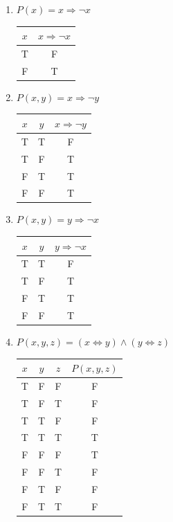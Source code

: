 \documentclass[12pt]{article}
\begin{document}
\begin{enumerate}
\begin{enumerate}
        \item[(b)] \(P(x) = x \Rightarrow \neg x\)
        \begin{center}
        \begin{tabular}{c|c}
        \(x\) & \(x \Rightarrow \neg x\) \\
        \hline
        T & F \\
        F & T \\
        \end{tabular}
        \end{center}

        \item[(c)] \(P(x, y) = x \Rightarrow \neg y\)
        \begin{center}
        \begin{tabular}{cc|c}
        \(x\) & \(y\) & \(x \Rightarrow \neg y\) \\
        \hline
        T & T & F \\
        T & F & T \\
        F & T & T \\
        F & F & T \\
        \end{tabular}
        \end{center}

        \item[(d)] \(P(x, y) = y \Rightarrow \neg x\)
        \begin{center}
        \begin{tabular}{cc|c}
        \(x\) & \(y\) & \(y \Rightarrow \neg x\) \\
        \hline
        T & T & F \\
        T & F & T \\
        F & T & T \\
        F & F & T \\
        \end{tabular}
        \end{center}

        \item[(e)] \(P(x, y, z) = (x \iff y) \land (y \iff z)\)
        \begin{center}
        \begin{tabular}{ccc|c}
        \(x\) & \(y\) & \(z\) & \(P(x, y, z)\) \\
        \hline
        T & F & F & F \\
        T & F & T & F \\
        T & T & F & F \\
        T & T & T & T \\
        F & F & F & T \\
        F & F & T & F \\
        F & T & F & F \\
        F & T & T & F \\
        \end{tabular}
        \end{center}


\end{enumerate}
\end{enumerate}
\end{document}
